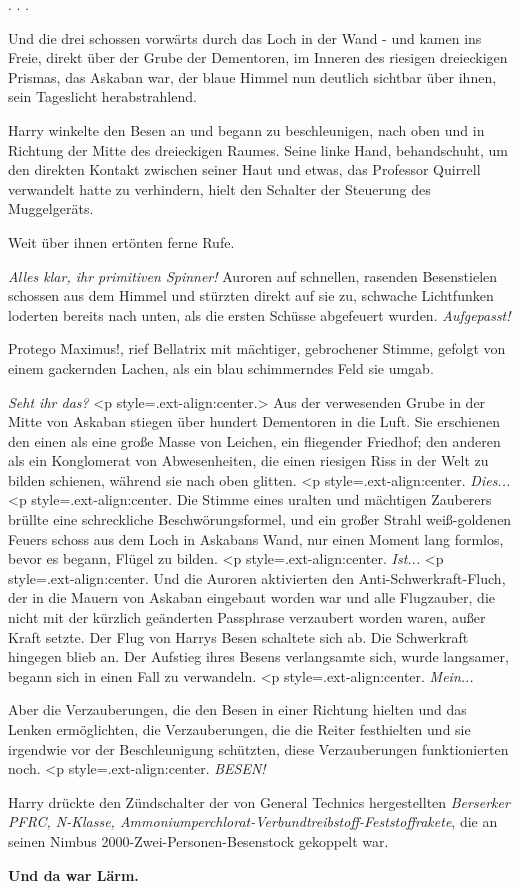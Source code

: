 . . .

Und die drei schossen vorwärts durch das Loch in der Wand - und kamen ins Freie,
direkt über der Grube der Dementoren, im Inneren des riesigen dreieckigen
Prismas, das Askaban war, der blaue Himmel nun deutlich sichtbar über ihnen,
sein Tageslicht herabstrahlend.

Harry winkelte den Besen an und begann zu beschleunigen, nach oben und in
Richtung der Mitte des dreieckigen Raumes. Seine linke Hand, behandschuht, um
den direkten Kontakt zwischen seiner Haut und etwas, das Professor Quirrell
verwandelt hatte zu verhindern, hielt den Schalter der Steuerung des
Muggelgeräts.

Weit über ihnen ertönten ferne Rufe.

\emph{Alles klar, ihr primitiven
Spinner!}      Auroren auf
schnellen, rasenden Besenstielen schossen aus dem Himmel und stürzten direkt auf
sie zu, schwache Lichtfunken loderten bereits nach unten, als die ersten Schüsse
abgefeuert wurden.  \emph{
Aufgepasst!}

\glqq{}Protego Maximus!\grqq{}, rief Bellatrix mit mächtiger, gebrochener Stimme,
gefolgt von einem gackernden Lachen, als ein blau schimmerndes Feld sie umgab.

\emph{Seht ihr das?}   <p
style=\grqq{}.ext-align:center\grqq{}.> Aus der verwesenden Grube in der Mitte
von Askaban stiegen über hundert Dementoren in die Luft. Sie erschienen den
einen als eine große Masse von Leichen, ein fliegender Friedhof; den anderen als
ein Konglomerat von Abwesenheiten, die einen riesigen Riss in der Welt zu bilden
schienen, während sie nach oben glitten. <p
style=\grqq{}.ext-align:center\grqq{}. \emph{ Dies...}   <p
style=\grqq{}.ext-align:center\grqq{}.  Die Stimme eines uralten und
mächtigen Zauberers brüllte eine schreckliche Beschwörungsformel, und ein großer
Strahl weiß-goldenen Feuers schoss aus dem Loch in Askabans Wand, nur einen
Moment lang formlos, bevor es begann, Flügel zu bilden. <p
style=\grqq{}.ext-align:center\grqq{}. \emph{Ist...}   <p
style=\grqq{}.ext-align:center\grqq{}.  Und die Auroren aktivierten den
Anti-Schwerkraft-Fluch, der in die Mauern von Askaban eingebaut worden war und
alle Flugzauber, die nicht mit der kürzlich geänderten Passphrase verzaubert
worden waren, außer Kraft setzte. Der Flug von Harrys Besen schaltete sich ab.
Die Schwerkraft hingegen blieb an. Der Aufstieg ihres Besens verlangsamte sich,
wurde langsamer, begann sich in einen Fall zu verwandeln. <p
style=\grqq{}.ext-align:center\grqq{}. \emph{Mein...}

Aber die Verzauberungen, die den Besen in einer Richtung hielten und das Lenken
ermöglichten, die Verzauberungen, die die Reiter festhielten und sie irgendwie
vor der Beschleunigung schützten, diese Verzauberungen funktionierten noch. <p
style=\grqq{}.ext-align:center\grqq{}. \emph{ BESEN!}

Harry drückte den Zündschalter der von General Technics hergestellten
\emph{Berserker PFRC, N-Klasse,
Ammoniumperchlorat-Verbundtreibstoff-Feststoffrakete}, die an seinen Nimbus
2000-Zwei-Personen-Besenstock gekoppelt war.



\textbf{Und da war Lärm.}

